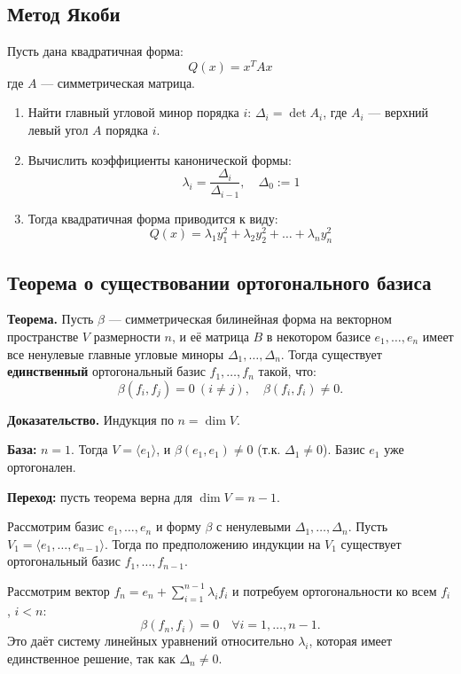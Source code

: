 \documentclass[12pt]{article}
\begin{document}
\subsection{Метод Якоби}

Пусть дана квадратичная форма:
\[
Q(x) = x^T A x
\]
где \( A \) — симметрическая матрица.

\begin{enumerate}
  \item Найти главный угловой минор порядка \( i \): \( \Delta_i = \det A_i \), где \( A_i \) — верхний левый угол \( A \) порядка \( i \).
  \item Вычислить коэффициенты канонической формы:
  \[
  \lambda_i = \frac{\Delta_i}{\Delta_{i-1}}, \quad \Delta_0 := 1
  \]
  \item Тогда квадратичная форма приводится к виду:
  \[
  Q(x) = \lambda_1 y_1^2 + \lambda_2 y_2^2 + \dots + \lambda_n y_n^2
  \]
\end{enumerate}

\subsection{Теорема о существовании ортогонального базиса}

\textbf{Теорема.} Пусть $\beta$ — симметрическая билинейная форма на векторном пространстве $V$ размерности $n$, и её матрица $B$ в некотором базисе $e_1, \dots, e_n$ имеет все ненулевые главные угловые миноры $\Delta_1, \dots, \Delta_n$. Тогда существует \textbf{единственный} ортогональный базис $f_1, \dots, f_n$ такой, что:
\[
\beta(f_i, f_j) = 0\ (i \ne j), \quad \beta(f_i, f_i) \ne 0.
\]

\textbf{Доказательство.}  
Индукция по $n = \dim V$.

\textbf{База:} $n = 1$. Тогда $V = \langle e_1 \rangle$, и $\beta(e_1, e_1) \ne 0$ (т.к. $\Delta_1 \ne 0$). Базис $e_1$ уже ортогонален.

\textbf{Переход:} пусть теорема верна для $\dim V = n-1$.

Рассмотрим базис $e_1, \dots, e_n$ и форму $\beta$ с ненулевыми $\Delta_1, \dots, \Delta_n$. Пусть $V_1 = \langle e_1, \dots, e_{n-1} \rangle$. Тогда по предположению индукции на $V_1$ существует ортогональный базис $f_1, \dots, f_{n-1}$.

Рассмотрим вектор $f_n = e_n + \sum_{i=1}^{n-1} \lambda_i f_i$ и потребуем ортогональности ко всем $f_i$, $i < n$:
\[
\beta(f_n, f_i) = 0 \quad \forall i = 1, \dots, n-1.
\]
Это даёт систему линейных уравнений относительно $\lambda_i$, которая имеет единственное решение, так как $\Delta_n \ne 0$.
\end{document}
